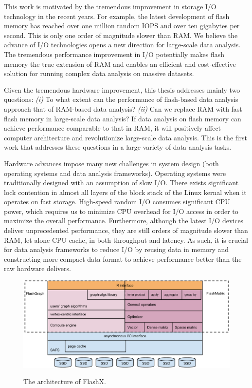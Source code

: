 This work is motivated
by the tremendous improvement in storage I/O technology in the recent years.
For example, the latest development of flash memory has
reached over one million random IOPS and over ten gigabytes per second. This
is only one order of magnitude slower than RAM. We believe the advance of
I/O technologies opens a new direction for large-scale data analysis.
The tremendous performance
improvement in I/O potentially makes flash memory the true extension of RAM
and enables an efficient and cost-effective solution for running complex
data analysis on massive datasets.

Given the tremendous hardware improvement, this thesis addresses mainly two
questions: \textit{(i)} To what extent can the performance of flash-based
data analysis approach that of RAM-based data analysis? \textit{(ii)} Can
we replace RAM with fast flash memory in large-scale data analysis? If data
analysis on flash memory can achieve performance comparable to that in RAM,
it will positively affect computer architecture and revolutionize large-scale
data analysis. This is the first work that addresses these questions in
a large variety of data analysis tasks.

Hardware advances impose many new challenges in system design (both operating
systems and data analysis frameworks). Operating systems were traditionally
designed with an assumption of slow I/O. There exists significant lock contention
in almost all layers of the block stack of the Linux kernal when it operates on
fast storage. High-speed random I/O consumes significant CPU power, which
requires us to minimize CPU overhead for I/O access in order to maximize
the overall performance. Furthermore, although the latest I/O devices deliver
unprecedented performance, they are still orders of magnitude slower than RAM,
let alone CPU cache, in both
throughput and latency. As such, it is crucial for data analysis frameworks to
reduce I/O by reusing data in memory and constructing more compact data format
to achieve performance better than the raw hardware delivers.

\makeatletter
\let\@currsize\normalsize
\makeatother

\begin{figure}[t]
\centering
\includegraphics[scale=0.5]{figs/arch.pdf}
\label{fig:arch}
\caption{The architecture of FlashX.}
\end{figure}

